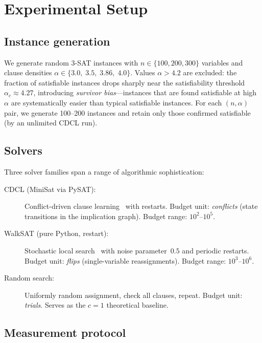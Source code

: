 \documentclass[11pt,a4paper]{article}
\begin{document}
\section{Experimental Setup}
\label{sec:experiments}

\subsection{Instance generation}

We generate random 3-SAT instances with $n \in \{100, 200, 300\}$
variables and clause densities
$\alpha \in \{3.0,\; 3.5,\; 3.86,\; 4.0\}$.
Values $\alpha > 4.2$ are excluded: the fraction of satisfiable
instances drops sharply near the satisfiability
threshold $\alpha_c \approx 4.27$, introducing
\emph{survivor bias}---instances that are found satisfiable
at high~$\alpha$ are systematically easier than typical
satisfiable instances.
For each $(n, \alpha)$ pair, we generate 100--200 instances and
retain only those confirmed satisfiable (by an unlimited CDCL run).

\subsection{Solvers}

Three solver families span a range of algorithmic sophistication:

\begin{description}
\item[CDCL (MiniSat via PySAT):]
  Conflict-driven clause learning~\cite{MarquesSilva1999} with restarts.
  Budget unit: \emph{conflicts} (state transitions in the
  implication graph).
  Budget range: $10^2$--$10^5$.

\item[WalkSAT (pure Python, restart):]
  Stochastic local search~\cite{SKC1994} with noise parameter~$0.5$
  and periodic restarts.
  Budget unit: \emph{flips} (single-variable reassignments).
  Budget range: $10^3$--$10^6$.

\item[Random search:]
  Uniformly random assignment, check all clauses, repeat.
  Budget unit: \emph{trials}.
  Serves as the $c = 1$ theoretical baseline.
\end{description}

\subsection{Measurement protocol}
\end{document}
